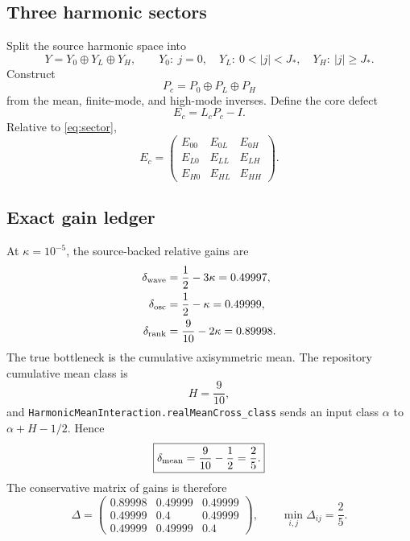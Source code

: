 \documentclass[11pt]{article}
\numberwithin{equation}{section}
\begin{document}
\subsection{Three harmonic sectors}
Split the source harmonic space into
\begin{equation}
Y=Y_0\oplus Y_L\oplus Y_H,
\qquad
Y_0:\ j=0,
\quad
Y_L:\ 0<|j|<J_*,
\quad
Y_H:\ |j|\ge J_*.
\label{eq:sector}
\end{equation}
Construct
\begin{equation}
P_c=P_0\oplus P_L\oplus P_H
\label{eq:parametrix}
\end{equation}
from the mean, finite-mode, and high-mode inverses.  Define the core defect
\begin{equation}
E_c=L_cP_c-I.
\label{eq:defect}
\end{equation}
Relative to \eqref{eq:sector},
\begin{equation}
E_c=
\begin{pmatrix}
E_{00}&E_{0L}&E_{0H}\\
E_{L0}&E_{LL}&E_{LH}\\
E_{H0}&E_{HL}&E_{HH}
\end{pmatrix}.
\label{eq:matrix}
\end{equation}

\subsection{Exact gain ledger}
At \(\kappa=10^{-5}\), the source-backed relative gains are
\begin{align}
\delta_{\rm wave}&=\frac12-3\kappa=0.49997,\label{eq:wavegain}\\
\delta_{\rm osc}&=\frac12-\kappa=0.49999,\label{eq:oscgain}\\
\delta_{\rm rank}&=\frac9{10}-2\kappa=0.89998.\label{eq:rankgain}
\end{align}
The true bottleneck is the cumulative axisymmetric mean.  The repository cumulative mean class is
\begin{equation}
H=\frac9{10},
\label{eq:H}
\end{equation}
and \texttt{HarmonicMeanInteraction.realMeanCross\_class} sends an input class \(\alpha\) to \(\alpha+H-1/2\).  Hence
\begin{equation}
\boxed{\delta_{\rm mean}=\frac9{10}-\frac12=\frac25.}
\label{eq:meangain}
\end{equation}
The conservative matrix of gains is therefore
\begin{equation}
\Delta=
\begin{pmatrix}
0.89998&0.49999&0.49999\\
0.49999&0.4&0.49999\\
0.49999&0.49999&0.4
\end{pmatrix},
\qquad
\min_{i,j}\Delta_{ij}=\frac25.
\label{eq:gaintable}
\end{equation}
\end{document}

